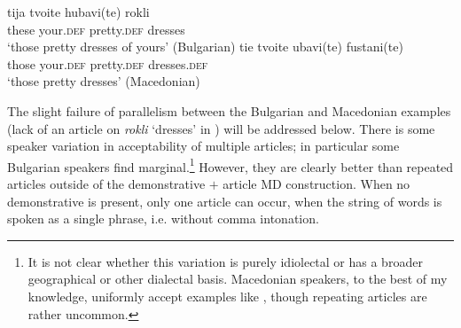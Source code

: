 \documentclass[output=paper,
colorlinks,
citecolor=brown,
newtxmath
]{langscibook}
\begin{document}

    \largerpage

\ea \label{dresses2}
\ea \label{dresses2b}
\gll tija 	tvoite	hubavi(te) 	rokli\\
these 	your.\textsc{def}	pretty.\textsc{def}	dresses \\
\glt ‘those pretty dresses of yours’ \hfill(Bulgarian)
\ex \label{dresses2m}
\gll tie 	tvoite ubavi(te)	fustani(te) \\
those your.\textsc{def}	pretty.\textsc{def} 	dresses.\textsc{def} \\
\glt‘those pretty dresses’ \hfill(Macedonian)
\z
\z

\noindent The slight failure of parallelism between the Bulgarian and Macedonian examples (lack of an article on \textit{rokli} `dresses' in ) will be addressed below. There is some speaker variation in acceptability of multiple articles; in particular some Bulgarian speakers find  marginal.\footnote{It is not clear whether this variation is purely idiolectal or has a broader geographical or other dialectal basis. Macedonian speakers, to the best of my knowledge, uniformly accept examples like , though repeating articles are rather uncommon.} However, they are clearly better than repeated articles outside of the demonstrative $+$ article MD construction. When no demonstrative is present, only one article can occur, when the string of words is spoken as a single phrase, i.e. without comma intonation.


\end{document}

